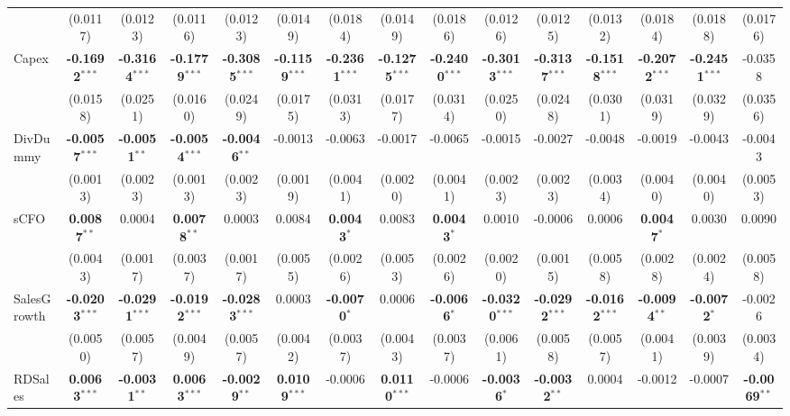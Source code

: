 \documentclass[11pt,a4paper]{article}
\begin{document}
\begin{table}[htbp]
\begin{tabular}{lcccccccccccccc}
 & (0.0117) & (0.0123) & (0.0116) & (0.0123) & (0.0149) & (0.0184) & (0.0149) & (0.0186) & (0.0126) & (0.0125) & (0.0132) & (0.0184) & (0.0188) & (0.0176) \\
Capex & \textbf{-0.1692}$^{***}$ & \textbf{-0.3164}$^{***}$ & \textbf{-0.1779}$^{***}$ & \textbf{-0.3085}$^{***}$ & \textbf{-0.1159}$^{***}$ & \textbf{-0.2361}$^{***}$ & \textbf{-0.1275}$^{***}$ & \textbf{-0.2400}$^{***}$ & \textbf{-0.3013}$^{***}$ & \textbf{-0.3137}$^{***}$ & \textbf{-0.1518}$^{***}$ & \textbf{-0.2072}$^{***}$ & \textbf{-0.2451}$^{***}$ & -0.0358 \\
 & (0.0158) & (0.0251) & (0.0160) & (0.0249) & (0.0175) & (0.0313) & (0.0177) & (0.0314) & (0.0250) & (0.0248) & (0.0301) & (0.0319) & (0.0329) & (0.0356) \\
DivDummy & \textbf{-0.0057}$^{***}$ & \textbf{-0.0051}$^{**}$ & \textbf{-0.0054}$^{***}$ & \textbf{-0.0046}$^{**}$ & -0.0013 & -0.0063 & -0.0017 & -0.0065 & -0.0015 & -0.0027 & -0.0048 & -0.0019 & -0.0043 & -0.0043 \\
 & (0.0013) & (0.0023) & (0.0013) & (0.0023) & (0.0019) & (0.0041) & (0.0020) & (0.0041) & (0.0023) & (0.0023) & (0.0034) & (0.0040) & (0.0040) & (0.0053) \\
sCFO & \textbf{0.0087}$^{**}$ & 0.0004 & \textbf{0.0078}$^{**}$ & 0.0003 & 0.0084 & \textbf{0.0043}$^{*}$ & 0.0083 & \textbf{0.0043}$^{*}$ & 0.0010 & -0.0006 & 0.0006 & \textbf{0.0047}$^{*}$ & 0.0030 & 0.0090 \\
 & (0.0043) & (0.0017) & (0.0037) & (0.0017) & (0.0055) & (0.0026) & (0.0053) & (0.0026) & (0.0020) & (0.0015) & (0.0058) & (0.0028) & (0.0024) & (0.0058) \\
SalesGrowth & \textbf{-0.0203}$^{***}$ & \textbf{-0.0291}$^{***}$ & \textbf{-0.0192}$^{***}$ & \textbf{-0.0283}$^{***}$ & 0.0003 & \textbf{-0.0070}$^{*}$ & 0.0006 & \textbf{-0.0066}$^{*}$ & \textbf{-0.0320}$^{***}$ & \textbf{-0.0292}$^{***}$ & \textbf{-0.0162}$^{***}$ & \textbf{-0.0094}$^{**}$ & \textbf{-0.0072}$^{*}$ & -0.0026 \\
 & (0.0050) & (0.0057) & (0.0049) & (0.0057) & (0.0042) & (0.0037) & (0.0043) & (0.0037) & (0.0061) & (0.0058) & (0.0057) & (0.0041) & (0.0039) & (0.0034) \\
RDSales & \textbf{0.0063}$^{***}$ & \textbf{-0.0031}$^{**}$ & \textbf{0.0063}$^{***}$ & \textbf{-0.0029}$^{**}$ & \textbf{0.0109}$^{***}$ & -0.0006 & \textbf{0.0110}$^{***}$ & -0.0006 & \textbf{-0.0036}$^{*}$ & \textbf{-0.0032}$^{**}$ & 0.0004 & -0.0012 & -0.0007 & \textbf{-0.0069}$^{**}$ \\

\end{tabular}
\end{table}
\end{document}
